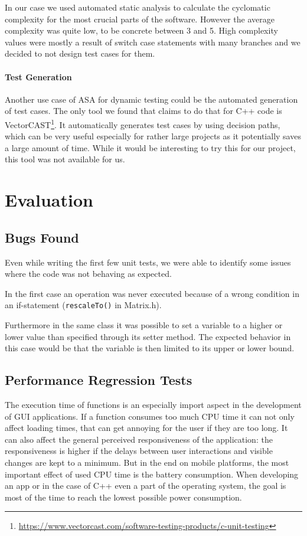 \documentclass{scrreprt}
\begin{document}
In our case we used automated static analysis to calculate the cyclomatic complexity for the most crucial parts of the software. However the average complexity was quite low, to be concrete between 3 and 5. High complexity values were mostly a result of switch case statements with many branches and we decided to not design test cases for them.

\paragraph{Test Generation} Another use case of ASA for dynamic testing could be the automated generation of test cases. The only tool we found that claims to do that for C++ code is VectorCAST\footnote{\url{https://www.vectorcast.com/software-testing-products/c-unit-testing}}. It automatically generates test cases by using decision paths, which can be very useful especially for rather large projects as it potentially saves a large amount of time. While it would be interesting to try this for our project, this tool was not available for us.

\section{Evaluation}

\subsection{Bugs Found}
Even while writing the first few unit tests, we were able to identify some issues where the code was not behaving as expected.

In the first case an operation was never executed because of a wrong condition in an if-statement (\texttt{rescaleTo()} in Matrix.h).

Furthermore in the same class it was possible to set a variable to a higher or lower value than specified through its setter method. The expected behavior in this case would be that the variable is then limited to its upper or lower bound.

\subsection{Performance Regression Tests}
\label{performance_regression_tests}

The execution time of functions is an especially import aspect in the development of GUI applications. If a function consumes too much CPU time it can not only affect loading times, that can get annoying for the user if they are too long. It can also affect the general perceived responsiveness of the application: the responsiveness is higher if the delays between user interactions and visible changes are kept to a minimum. But in the end on mobile platforms, the most important effect of used CPU time is the battery consumption. When developing an app or in the case of C++ even a part of the operating system, the goal is most of the time to reach the lowest possible power consumption.
\end{document}
